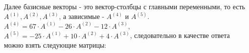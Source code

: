         Далее базисные векторы - это вектор-столбцы с главными переменными, то есть $A^{(1)}, A^{(2)}, A^{(3)}$,
        а зависимые - $A^{(4)} \text{ и } A^{(5)}$. \\
        $A^{(4)}=67 \cdot A^{(1)} - 26 \cdot A^{(2)} - 12 \cdot A^{(3)}$, $A^{(5)}=-25 \cdot A^{(1)} + 10 \cdot A^{(2)} +4 \cdot A^{(3)}$, следовательно в качестве ответа можно взять следующие матрицы:

